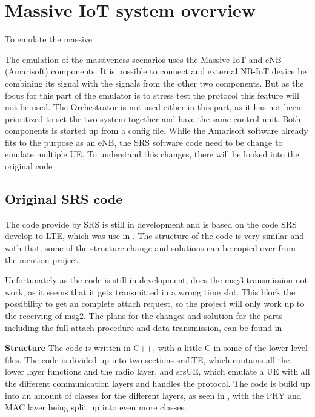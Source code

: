 \chapter{Massive IoT system overview}

To emulate the massive

The emulation of the massiveness scenarios uses the Massive IoT and eNB (Amarisoft) components. It is possible to connect and external NB-IoT device be combining its signal with the signals from the other two components. But as the focus for this part of the emulator is to stress test the protocol this feature will not be used. The Orchestrator is not used either in this part, as it has not been prioritized to set the two system together and have the same control unit. Both components is started up from a config file. While the Amarisoft software already fits to the purpose as an eNB, the SRS software code need to be change to emulate multiple UE. To understand this changes, there will be looked into the original code

\section{Original SRS code}
The code provide by SRS is still in development and is based on the code SRS develop to LTE, which was use in . The structure of the code is very similar and with that, some of the structure change and solutions can be copied over from the mention project.

Unfortunately as the code is still in development, does the msg3 transmission not work, as it seems that it gets transmitted in a wrong time slot.  This block the possibility to get an complete attach request, so the project will only work up to the receiving of msg2. The plans for the changes and solution for the parts including the full attach procedure and data transmission, can be found in 

\textbf{Structure}
The code is written in C++, with a little C in some of the lower level files. The code is divided up into two sections srsLTE, which contains all the lower layer functions and the radio layer, and srsUE, which emulate a UE with all the different communication layers and handles the protocol. The code is build up into an amount of classes for the different layers, as seen in , with the PHY and MAC layer being split up into even more classes.

